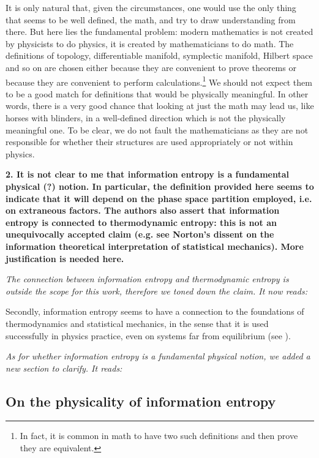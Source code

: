 \documentclass[11pt]{article}
\begin{document}
It is only natural that, given the circumstances, one would use the only thing that seems to be well defined, the math, and try to draw understanding from there. But here lies the fundamental problem: modern mathematics is not created by physicists to do physics, it is created by mathematicians to do math. The definitions of topology, differentiable manifold, symplectic manifold, Hilbert space and so on are chosen either because they are convenient to prove theorems or because they are convenient to perform calculations.\footnote{In fact, it is common in math to have two such definitions and then prove they are equivalent.} We should not expect them to be a good match for definitions that would be physically meaningful. In other words, there is a very good chance that looking at just the math may lead us, like horses with blinders, in a well-defined direction which is not the physically meaningful one. To be clear, we do not fault the mathematicians as they are not responsible for whether their structures are used appropriately or not within physics.

\vspace{1cm}

\textbf{2. It is not clear to me that information entropy is a fundamental physical (?) notion. In particular, the definition provided here seems to indicate that it will depend on the phase space partition employed, i.e. on extraneous factors. The authors also assert that information entropy is connected to thermodynamic entropy: this is not an unequivocally accepted claim (e.g. see Norton's dissent on the information theoretical interpretation of statistical mechanics). More justification is needed here.}

\emph{The connection between information entropy and thermodynamic entropy is outside the scope for this work, therefore we toned down the claim. It now reads:}

Secondly, information entropy seems to have a connection to the foundations of thermodynamics and statistical mechanics, in the sense that it is used successfully in physics practice, even on systems far from equilibrium (see \cite{Jarzynski, Maes, Horowitz}).

\emph{As for whether information entropy is a fundamental physical notion, we added a new section to clarify. It reads:}

\subsection*{On the physicality of information entropy}
\end{document}
